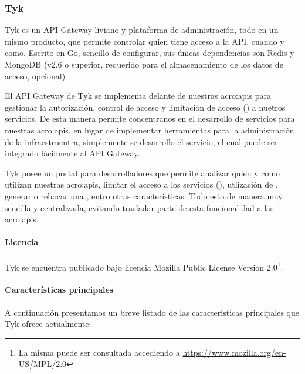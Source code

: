 \subsubsection{Tyk}
\label{soa:tecnologias:tyk}

Tyk es un API Gateway liviano y plataforma de administración, todo en un mismo producto, que permite controlar quien tiene acceso a la API, cuando y como.  Escrito en Go, sencillo de configurar, sus únicas dependencias son Redis y MongoDB (v2.6 o superior, requerido para el almacenamiento de los datos de acceso, opcional)

El API Gateway de Tyk se implementa delante de nuestras \glspl{acro:api} para gestionar la autorización, control de acceso y limitación de acceso () a nuetros servicios.  De esta manera permite concentranos en el desarrollo de servicios para nuestras \glspl{acro:api}, en lugar de implementar herramientas para la administración de la infraestrucutra, simplemente se desarrollo el servicio, el cual puede ser integrado fácilmente al API Gateway.

Tyk posee un portal para desarrolladores que permite analizar quien y como utilizan nuestras \glspl{acro:api}, limitar el acceso a los servicios (), utlización de , generar o rebocar una , entro otras características.  Todo esto de manera muy sencilla y centralizada, evitando trasladar parte de esta funcionalidad a las \glspl{acro:api}.

\paragraph{Licencia}

Tyk se encuentra publicado bajo licencia Mozilla Public License Version 2.0\footnote{La misma puede ser consultada accediendo a \url{https://www.mozilla.org/en-US/MPL/2.0}}.

\paragraph{Características principales}

A continuación presentamos un breve listado de las características principales que Tyk ofrece actualmente:

